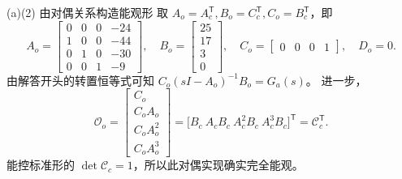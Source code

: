 \documentclass[11pt]{article}
\begin{document}
\begin{solution}
\begin{proofstep}{(a)(2) 由对偶关系构造能观形}
取 $A_o=A_c^{\mathsf T},B_o=C_c^{\mathsf T},C_o=B_c^{\mathsf T}$，即
\[
A_o=\begin{bmatrix}0&0&0&-24\\1&0&0&-44\\0&1&0&-30\\0&0&1&-9\end{bmatrix},\quad
B_o=\begin{bmatrix}25\\17\\3\\0\end{bmatrix},\quad
C_o=\begin{bmatrix}0&0&0&1\end{bmatrix},\quad D_o=0.
\]
由解答开头的转置恒等式可知 $C_o(sI-A_o)^{-1}B_o=G_a(s)$。
进一步，
\[
\mathcal O_o=\begin{bmatrix}C_o\\C_oA_o\\C_oA_o^2\\C_oA_o^3\end{bmatrix}
=\bigl[B_c\ A_cB_c\ A_c^2B_c\ A_c^3B_c\bigr]^{\mathsf T}
=\mathcal C_c^{\mathsf T}.
\]
能控标准形的 $\det\mathcal C_c=1$，所以此对偶实现确实完全能观。
\end{proofstep}


\end{solution}
\end{document}
